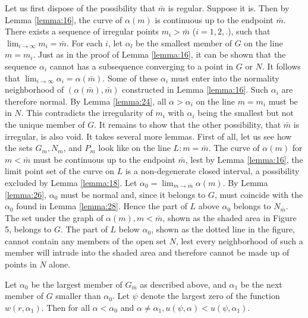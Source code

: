 Let us first dispose of the possibility that $\bar{m}$ is regular. Suppose it is.
Then by Lemma \ref{lemma:16}, the curve of $\alpha(m)$ is continuous up to the endpoint $\bar{m}$.
There exists a sequence of irregular points $m_i>\bar{m}$ ($i=1,2,.$),
such that $\lim_{i \rightarrow \infty} m_i=\bar{m}$.
For each $i$, let $\alpha_l$ be the smallest member of $G$ on the line $m=m_i$.
Just as in the proof of Lemma \ref{lemma:16}, it can be shown that the sequence $\alpha_i$ 
cannot has a subsequence converging to a point in $G$ or $N$. 
It follows that $\lim _{i \rightarrow \infty} \alpha_i=\alpha(\bar{m})$. 
Some of these $\alpha_i$ must enter into the normality neighborhood 
of $(\alpha(\bar{m}),\bar{m})$ constructed in Lemma \ref{lemma:16}. 
Such $\alpha_i$ are therefore normal. 
By Lemma \ref{lemma:24}, all $\alpha>\alpha_i$ on the line $m=m_i$ must be in $N$. 
This contradicts the irregularity of $m_i$ with $\alpha_i$ being the smallest 
but not the unique member of $G$. It remains to show that the other possibility,
that $\bar{m}$ is irregular, is also void. It takes several more lemmas.
First of all, let us see how the sets $G_m, N_m$,
and $P_m$ look like on the line $L: m=\bar{m}$.
The curve of $\alpha(m)$ for $m<\bar{m}$ must be continuous up to the endpoint $\bar{m}$,
lest by Lemma \ref{lemma:16}, the limit point set of the curve on $L$ is a non-degenerate closed interval, 
a possibility excluded by Lemma \ref{lemma:18}. Let $\alpha_0=\lim _{m \rightarrow \bar{m}} \alpha(m)$.
By Lemma \ref{lemma:26}, $\alpha_0$ must be normal and, since it belongs to $G$,
must coincide with the $\alpha_0$ found in Lemma \ref{lemma:28}.
Hence the part of $L$ above $\alpha_0$ belongs to $N_{\bar{m}}$.
The set under the graph of $\alpha(m), m<\bar{m}$, shown as the shaded area in Figure 5,
belongs to $G$. The part of $L$ below $\alpha_0$, shown as the dotted line in the figure, 
cannot contain any members of the open set $N$, lest every neighborhood of such a member will 
intrude into the shaded area and therefore cannot be made up of points in $N$ alone.

\begin{lemma}\label{lemma:31}
  Let $\alpha_0$ be the largest member of $G_{\bar{m}}$ as described above, and $\alpha_1$ be the next member of $G$ smaller than $\alpha_0$. Let $\psi$ denote the largest zero of the function $w\left(r, \alpha_1\right)$. Then for all $\alpha<\alpha_0$ and $\alpha \neq \alpha_1, u(\psi, \alpha)<u\left(\psi, \alpha_1\right)$.
\end{lemma}


